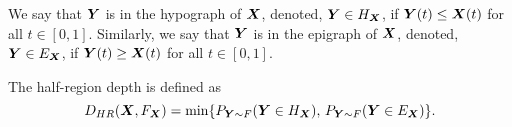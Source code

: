 \begin{definition}
    We say that $\bm{Y}$ is in the hypograph of $\bm{X}$, denoted, $\bm{Y} \in
    H_{\bm{X}}$, if $\bm{Y}(t) \leq \bm{X}(t)$ for all $t \in [0, 1]$.
    Similarly, we say that $\bm{Y}$ is in the epigraph of $\bm{X}$, denoted, $\bm{Y}
    \in E_{\bm{X}}$, if $\bm{Y}(t) \geq \bm{X}(t)$ for all $t \in [0, 1]$.
\end{definition}

\begin{definition}
    The half-region depth is defined as
    \begin{equation}
        D_{HR}(\bm{X}, F_{\bm{X}}) = \min\{P_{\bm{Y} \sim F}(\bm{Y} \in H_{\bm{X}}),\, P_{\bm{Y} \sim F}(\bm{Y} \in E_{\bm{X}})\}.
    \end{equation}
\end{definition}
